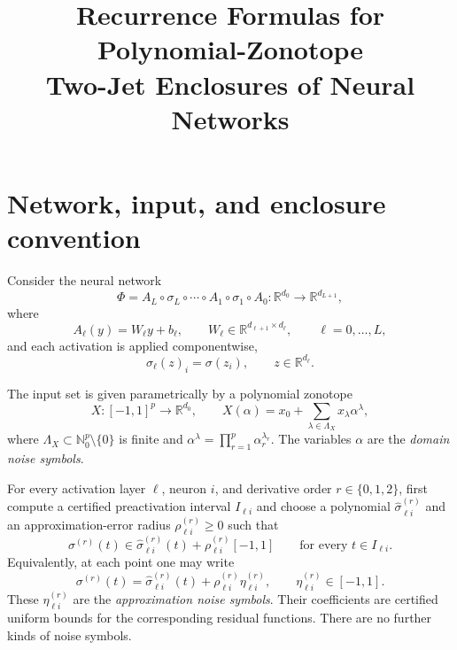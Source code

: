 \documentclass[11pt]{article}
\title{Recurrence Formulas for Polynomial-Zonotope\\
Two-Jet Enclosures of Neural Networks}
\author{}
\date{}
\newcommand{\R}{\mathbb{R}}
\newcommand{\N}{\mathbb{N}}
\begin{document}
\maketitle

\section{Network, input, and enclosure convention}

Consider the neural network
\begin{equation}
    \Phi
    =A_L\circ\sigma_L\circ\cdots\circ A_1\circ\sigma_1\circ A_0
    :\R^{d_0}\longrightarrow\R^{d_{L+1}},
    \label{eq:network}
\end{equation}
where
\[
    A_\ell(y)=W_\ell y+b_\ell,
    \qquad
    W_\ell\in\R^{d_{\ell+1}\times d_\ell},
    \qquad \ell=0,\ldots,L,
\]
and each activation is applied componentwise,
\[
    \sigma_\ell(z)_i=\sigma(z_i),
    \qquad z\in\R^{d_\ell}.
\]

The input set is given parametrically by a polynomial zonotope
\begin{equation}
    X:[-1,1]^p\longrightarrow\R^{d_0},
    \qquad
    X(\alpha)=x_0+\sum_{\lambda\in\Lambda_X}x_\lambda\alpha^\lambda,
    \label{eq:input-pz}
\end{equation}
where \(\Lambda_X\subset\N_0^p\setminus\{0\}\) is finite and
\(\alpha^\lambda=\prod_{r=1}^p\alpha_r^{\lambda_r}\).
The variables \(\alpha\) are the \emph{domain noise symbols}.

For every activation layer \(\ell\), neuron \(i\), and derivative order
\(r\in\{0,1,2\}\), first compute a certified preactivation interval
\(I_{\ell i}\) and choose a polynomial \(\widehat\sigma_{\ell i}^{(r)}\)
and an approximation-error radius \(\rho_{\ell i}^{(r)}\geq0\) such that
\begin{equation}
    \sigma^{(r)}(t)
    \in
    \widehat\sigma_{\ell i}^{(r)}(t)
    +\rho_{\ell i}^{(r)}[-1,1]
    \qquad\text{for every }t\in I_{\ell i}.
    \label{eq:scalar-enclosure}
\end{equation}
Equivalently, at each point one may write
\begin{equation}
    \sigma^{(r)}(t)
    =\widehat\sigma_{\ell i}^{(r)}(t)
     +\rho_{\ell i}^{(r)}\eta_{\ell i}^{(r)},
    \qquad \eta_{\ell i}^{(r)}\in[-1,1].
    \label{eq:scalar-noise}
\end{equation}
These \(\eta_{\ell i}^{(r)}\) are the \emph{approximation noise symbols}.
Their coefficients are certified uniform bounds for the corresponding
residual functions.  There are no further kinds of noise symbols.
\end{document}
